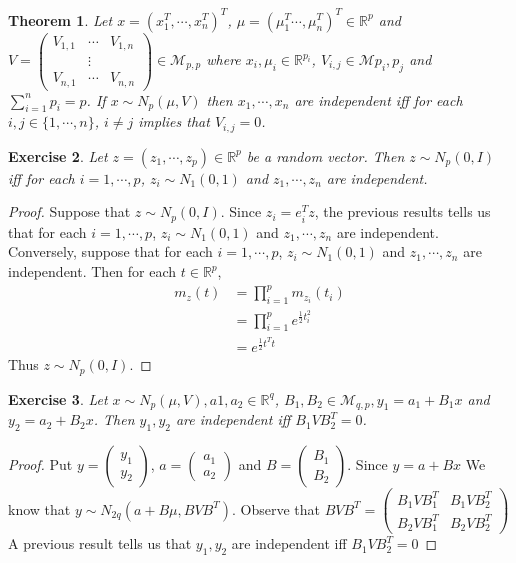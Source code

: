 \documentclass[12pt]{amsart}
\newtheorem{thm}{Theorem}[section]
\newtheorem{ex}[thm]{Exercise}
\newcommand{\R}{\mathbb{R}}
\newcommand{\MM}{\mathcal{M}}
\begin{document}
\begin{thm}
Let $x = (x_1^T, \cdots, x_n^T)^T$, $\mu = (\mu_1^T \cdots, \mu_n^T)^T \in \R^p$ and $V = 
\begin{pmatrix}
V_{1,1} & \cdots & V_{1,n} \\
  & \vdots&  \\
V_{n,1} & \cdots & V_{n,n} 
\end{pmatrix} \in \MM_{p,p}$ 
where $x_i, \mu_i \in \R^{p_i}$, $V_{i,j} \in \MM{p_i, p_j}$ and $\sum\limits_{i=1}^n p_i = p$. If $x \sim N_{p}(\mu, V)$ then $x_1, \cdots, x_n$ are independent iff for each $i,j \in \{1, \cdots, n\}$, $i \neq j$ implies that $V_{i,j} = 0$.
\end{thm}

\begin{ex}
Let $z = (z_1, \cdots, z_p) \in \R^p$ be a random vector. Then $z \sim N_p(0,I)$ iff for each $i = 1, \cdots, p$, $z_i \sim N_1(0, 1)$ and $z_1, \cdots, z_n$ are independent.
\end{ex}

\begin{proof}
Suppose that $z \sim N_p(0,I)$. Since $z_i = e_i^Tz$, the previous results tells us that for each $i = 1, \cdots, p$, $z_i \sim N_1(0, 1)$ and $z_1, \cdots, z_n$ are independent. Conversely, suppose that for each $i = 1, \cdots, p$, $z_i \sim N_1(0, 1)$ and $z_1, \cdots, z_n$ are independent. Then for each $t \in \R^p$, 
\begin{align*}
m_z(t) 
&= \prod_{i=1}^pm_{z_i}(t_i) \\
&= \prod_{i=1}^p e^{\frac{1}{2}t_i^2} \\
&= e^{\frac{1}{2}t^Tt}
\end{align*}
Thus $z \sim N_p(0, I)$.
\end{proof}

\begin{ex}
Let $x \sim N_p(\mu, V), a1, a_2 \in \R^q$, $B_1, B_2 \in \MM_{q,p}, y_1 = a_1 +B_1x$ and $y_2 = a_2 + B_2x$. Then $y_1, y_2$ are independent iff $B_1VB_2^T = 0$. 
\end{ex}

\begin{proof}
Put $y = 
\begin{pmatrix}
y_1 \\ y_2
\end{pmatrix}
$, $a = 
\begin{pmatrix}
a_1 \\ a_2
\end{pmatrix}$ 
and $B = 
\begin{pmatrix}
B_1 \\B_2
\end{pmatrix}$. Since 
$y
= 
a
+
B
x$
We know that $y \sim N_{2q}(a+B\mu, BVB^T)$. Observe that $BVB^T = 
\begin{pmatrix}
B_1VB_1^T & B_1VB_2^T \\
B_2VB_1^T & B_2VB_2^T
\end{pmatrix}
$ A previous result tells us that $y_1, y_2$ are independent iff $B_1VB_2^T = 0$
\end{proof}
\end{document}

